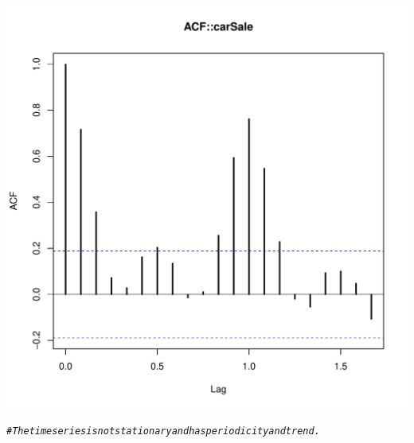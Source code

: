 \documentclass[10pt]{article}\usepackage[]{graphicx}\usepackage[]{color}
\makeatletter
\def\maxwidth{ %
  \ifdim\Gin@nat@width>\linewidth
    \linewidth
  \else
    \Gin@nat@width
  \fi
}
\newcommand{\hlcom}[1]{\textcolor[rgb]{0.678,0.584,0.686}{\textit{#1}}}%
\newenvironment{kframe}{%
 \def\at@end@of@kframe{}%
 \ifinner\ifhmode%
  \def\at@end@of@kframe{\end{minipage}}%
  \begin{minipage}{\columnwidth}%
 \fi\fi%
 \def\FrameCommand##1{\hskip\@totalleftmargin \hskip-\fboxsep
 \colorbox{shadecolor}{##1}\hskip-\fboxsep
     \hskip-\linewidth \hskip-\@totalleftmargin \hskip\columnwidth}%
 \MakeFramed {\advance\hsize-\width
   \@totalleftmargin\z@ \linewidth\hsize
   \@setminipage}}%
 {\par\unskip\endMakeFramed%
 \at@end@of@kframe}
\newenvironment{knitrout}{}{} %
\makeatother
\begin{document}
\begin{knitrout}
\begin{kframe}
\begin{alltt}
\end{alltt}
\end{kframe}
\includegraphics[width=\maxwidth]{figure/unnamed-chunk-32-2} 
\begin{kframe}\begin{alltt}
\hlcom{#The time series is not stationary and has periodicity and trend.}


\end{alltt}
\end{kframe}
\end{knitrout}
\end{document}
